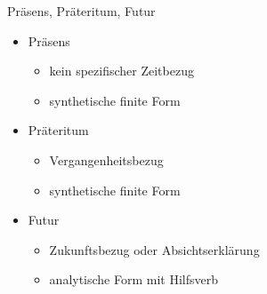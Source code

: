 \begin{frame}
  {Präsens, Präteritum, Futur}
  \onslide<+->
  \begin{itemize}[<+->]
    \item Präsens
      \begin{itemize}[<+->]
        \item kein spezifischer Zeitbezug
        \item synthetische finite Form
      \end{itemize}
      \Viertelzeile
    \item Präteritum
      \begin{itemize}[<+->]
        \item Vergangenheitsbezug
        \item synthetische finite Form
      \end{itemize}
     \Viertelzeile 
    \item Futur
      \begin{itemize}[<+->]
        \item Zukunftsbezug oder Absichtserklärung
        \item analytische Form mit  Hilfsverb
      \end{itemize}
  \end{itemize}
  \onslide<+->
  \Halbzeile
  \hspace{3em}
\end{frame}

